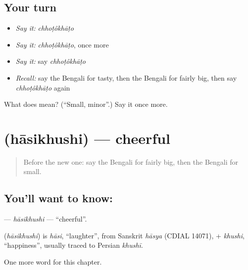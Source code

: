 \subsection*{Your turn}
\begin{itemize}
\raggedright
  \item \emph{Say it:} \emph{chhoṭôkhāṭo}
  \item \emph{Say it:} \emph{chhoṭôkhāṭo}, once more
  \item \emph{Say it:} say \emph{chhoṭôkhāṭo}
  \item \emph{Recall:} say the Bengali for tasty, then the Bengali for fairly big, then say \emph{chhoṭôkhāṭo} again
\end{itemize}

\begin{tcolorbox}[breakable,colback=teal!4,colframe=teal!35!black,title={Before you move on}]
What does  mean? (\textquotedblleft{}Small, minor\textquotedblright{}.) Say it once more.
\end{tcolorbox}
\section[\texorpdfstring{\bn{হাসিখুশি} (hāsikhushi)}{হাসিখুশি (hāsikhushi)}]{ (hāsikhushi) — cheerful}

\label{lesson:BN-C143-hasikhushi}



\begin{quote}
Before the new one: say the Bengali for fairly big, then the Bengali for small.
\end{quote}

\subsection*{You'll want to know: }
\textbf{} — \emph{hāsikhushi} — \textquotedblleft{}cheerful\textquotedblright{}.

\begin{cousinweb}
\textbf{} (\emph{hāsikhushi}) is \emph{hāsi}, \textquotedblleft{}laughter\textquotedblright{}, from Sanskrit \emph{hāsya} (CDIAL 14071), + \emph{khushi}, \textquotedblleft{}happiness\textquotedblright{}, usually traced to Persian \emph{khushī}.
\end{cousinweb}

\begin{grammarlens}[title={What you've built}]
One more word for this chapter.
\end{grammarlens}


